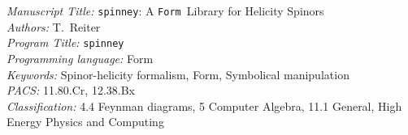 \documentclass[preprint,number,12pt,sort&compress]{elsarticle}
\newcommand{\FORM}{{\texttt{Form}}}
\newcommand{\spinney}{{\texttt{spinney}}}
\begin{document}
\begin{small}
\noindent
{\em Manuscript Title:} 
\spinney: A \FORM\ Library for Helicity Spinors\\
{\em Authors:} T.~Reiter\\
{\em Program Title:} \spinney\\
{\em Programming language:} Form \\
{\em Keywords:} Spinor-helicity formalism, Form, Symbolical manipulation\\
{\em PACS:} 11.80.Cr, 12.38.Bx \\
{\em Classification:}
   4.4 Feynman diagrams,
   5 Computer Algebra,
   11.1  General, High Energy Physics and Computing\\

\end{small}
\end{document}
